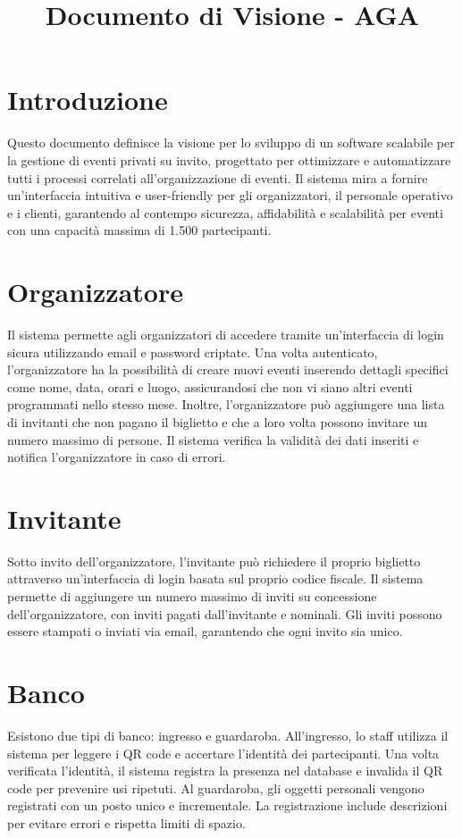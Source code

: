 \documentclass[a4paper]{article}
\title{\textcolor{titlecolor}{\Huge \textbf{ Documento di Visione - AGA}}}
\author{}
\date{}
\begin{document}
\maketitle

\section*{\textcolor{sectioncolor}{Introduzione}}
\textcolor{textcolor}{
Questo documento definisce la visione per lo sviluppo di un software scalabile per la gestione di eventi privati su invito, progettato per ottimizzare e automatizzare tutti i processi correlati all'organizzazione di eventi. Il sistema mira a fornire un'interfaccia intuitiva e user-friendly per gli organizzatori, il personale operativo e i clienti, garantendo al contempo sicurezza, affidabilità e scalabilità per eventi con una capacità massima di 1.500 partecipanti.
}

\section*{\textcolor{sectioncolor}{Organizzatore}}
\textcolor{textcolor}{
Il sistema permette agli organizzatori di accedere tramite un’interfaccia di login sicura utilizzando email e password criptate. Una volta autenticato, l’organizzatore ha la possibilità di creare nuovi eventi inserendo dettagli specifici come nome, data, orari e luogo, assicurandosi che non vi siano altri eventi programmati nello stesso mese. Inoltre, l’organizzatore può aggiungere una lista di invitanti che non pagano il biglietto e che a loro volta possono invitare un numero massimo di persone. Il sistema verifica la validità dei dati inseriti e notifica l’organizzatore in caso di errori.
}

\section*{\textcolor{sectioncolor}{Invitante}}
\textcolor{textcolor}{
Sotto invito dell’organizzatore, l'invitante può richiedere il proprio biglietto attraverso un’interfaccia di login basata sul proprio codice fiscale. Il sistema permette di aggiungere un numero massimo di inviti su concessione dell’organizzatore, con inviti pagati dall’invitante e nominali. Gli inviti possono essere stampati o inviati via email, garantendo che ogni invito sia unico.
}

\section*{\textcolor{sectioncolor}{Banco}}
\textcolor{textcolor}{
Esistono due tipi di banco: ingresso e guardaroba. All'ingresso, lo staff utilizza il sistema per leggere i QR code e accertare l'identità dei partecipanti. Una volta verificata l’identità, il sistema registra la presenza nel database e invalida il QR code per prevenire usi ripetuti. Al guardaroba, gli oggetti personali vengono registrati con un posto unico e incrementale. La registrazione include descrizioni per evitare errori e rispetta limiti di spazio.
}
\end{document}
